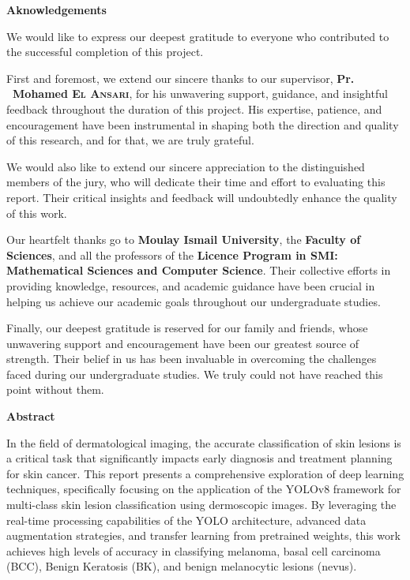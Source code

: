 \documentclass[a4paper,12pt]{report}
\begin{document}
\newpage
\begin{spacing}{1.5}
     \begin{center}
         \textbf{\huge Aknowledgements}
     \end{center}

    We would like to express our deepest gratitude to everyone who contributed to the successful completion of this project.

    First and foremost, we extend our sincere thanks to our supervisor, \textbf{Pr. ~Mohamed \textsc{El Ansari}}, for his unwavering support, guidance, and insightful feedback throughout the duration of this project. His expertise, patience, and encouragement have been instrumental in shaping both the direction and quality of this research, and for that, we are truly grateful.

    We would also like to extend our sincere appreciation to the distinguished members of the jury, who will dedicate their time and effort to evaluating this report. Their critical insights and feedback will undoubtedly enhance the quality of this work.

    Our  heartfelt thanks go to \textbf{Moulay Ismail University}, the \textbf{Faculty of Sciences}, and all the professors of the \textbf{Licence Program in SMI: Mathematical Sciences and Computer Science}. Their collective efforts in providing knowledge, resources, and academic guidance have been crucial in helping us achieve our academic goals throughout our undergraduate studies.

    Finally, our deepest gratitude is reserved for our family and friends, whose unwavering support and encouragement have been our greatest source of strength. Their belief in us has been invaluable in overcoming the challenges faced during our undergraduate studies. We truly could not have reached this point without them.

    \newpage
    \begin{center}
        \textbf{\huge Abstract}
    \end{center}
    
    In the field of dermatological imaging, the accurate classification of skin lesions is a critical task that significantly impacts early diagnosis and treatment planning for skin cancer. This report presents a comprehensive exploration of deep learning techniques, specifically focusing on the application of the YOLOv8 framework for multi-class skin lesion classification using dermoscopic images. By leveraging the real-time processing capabilities of the YOLO architecture, advanced data augmentation strategies, and transfer learning from pretrained weights, this work achieves high levels of accuracy in classifying melanoma, basal cell carcinoma (BCC), Benign Keratosis (BK), and benign melanocytic lesions (nevus).
    

\end{spacing}
\end{document}
